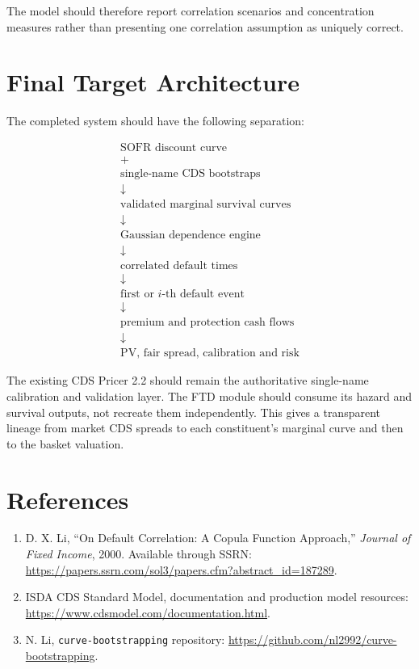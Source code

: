 \documentclass[11pt,a4paper]{article}
\begin{document}
The model should therefore report correlation scenarios and concentration measures rather than presenting one correlation assumption as uniquely correct.

\section{Final Target Architecture}

The completed system should have the following separation:

\[
\boxed{
\begin{array}{c}
\text{SOFR discount curve} \\
+ \\
\text{single-name CDS bootstraps} \\
\downarrow \\
\text{validated marginal survival curves} \\
\downarrow \\
\text{Gaussian dependence engine} \\
\downarrow \\
\text{correlated default times} \\
\downarrow \\
\text{first or $i$-th default event} \\
\downarrow \\
\text{premium and protection cash flows} \\
\downarrow \\
\text{PV, fair spread, calibration and risk}
\end{array}
}
\]

The existing CDS Pricer 2.2 should remain the authoritative single-name calibration and validation layer. The FTD module should consume its hazard and survival outputs, not recreate them independently. This gives a transparent lineage from market CDS spreads to each constituent's marginal curve and then to the basket valuation.

\section*{References}

\begin{enumerate}
    \item D. X. Li, ``On Default Correlation: A Copula Function Approach,'' \textit{Journal of Fixed Income}, 2000. Available through SSRN: \url{https://papers.ssrn.com/sol3/papers.cfm?abstract_id=187289}.
    \item ISDA CDS Standard Model, documentation and production model resources: \url{https://www.cdsmodel.com/documentation.html}.
    \item N. Li, \texttt{curve-bootstrapping} repository: \url{https://github.com/nl2992/curve-bootstrapping}.
\end{enumerate}
\end{document}
